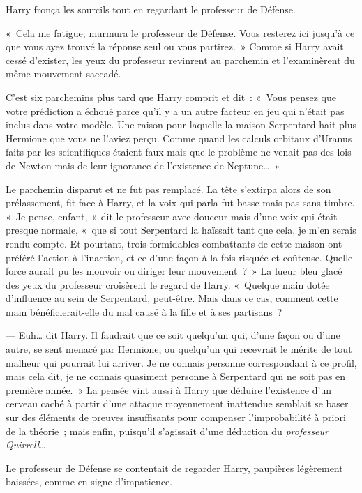 Harry fronça les sourcils tout en regardant le professeur de Défense.

«~Cela me fatigue, murmura le professeur de Défense.
Vous resterez ici jusqu'à ce que vous ayez trouvé la réponse seul ou vous partirez.~»
Comme si Harry avait cessé d'exister, les yeux du professeur revinrent au parchemin et l'examinèrent du même mouvement saccadé.

C'est six parchemins plus tard que Harry comprit et dit~: «~Vous pensez que votre prédiction a échoué parce qu'il y a un autre facteur en jeu qui n'était pas inclus dans votre modèle.
Une raison pour laquelle la maison Serpentard hait plus Hermione que vous ne l'aviez perçu.
Comme quand les calculs orbitaux d'Uranus faits par les scientifiques étaient faux mais que le problème ne venait pas des lois de Newton mais de leur ignorance de l'existence de Neptune…~»

Le parchemin disparut et ne fut pas remplacé.
La tête s'extirpa alors de son prélassement, fit face à Harry, et la voix qui parla fut basse mais pas sans timbre.
«~Je pense, enfant,~» dit le professeur avec douceur mais d'une voix qui était presque normale, «~que si tout Serpentard la haïssait tant que cela, je m'en serais rendu compte.
Et pourtant, trois formidables combattants de cette maison ont préféré l'action à l'inaction, et ce d'une façon à la fois risquée et coûteuse.
Quelle force aurait pu les mouvoir ou diriger leur mouvement~?~»
La lueur bleu glacé des yeux du professeur croisèrent le regard de Harry.
«~Quelque main dotée d'influence au sein de Serpentard, peut-être.
Mais dans ce cas, comment cette main bénéficierait-elle du mal causé à la fille et à ses partisans~?

--- Euh… dit Harry.
Il faudrait que ce soit quelqu'un qui, d'une façon ou d'une autre, se sent menacé par Hermione, ou quelqu'un qui recevrait le mérite de tout malheur qui pourrait lui arriver.
Je ne connais personne correspondant à ce profil, mais cela dit, je ne connais quasiment personne à Serpentard qui ne soit pas en première année.~»
La pensée vint aussi à Harry que déduire l'existence d'un cerveau caché à partir d'une attaque moyennement inattendue semblait se baser sur des éléments de preuves insuffisants pour compenser l'improbabilité à priori de la théorie~; mais enfin, puisqu'il s'agissait d'une déduction du \emph{professeur Quirrell}…

Le professeur de Défense se contentait de regarder Harry, paupières légèrement baissées, comme en signe d'impatience.

